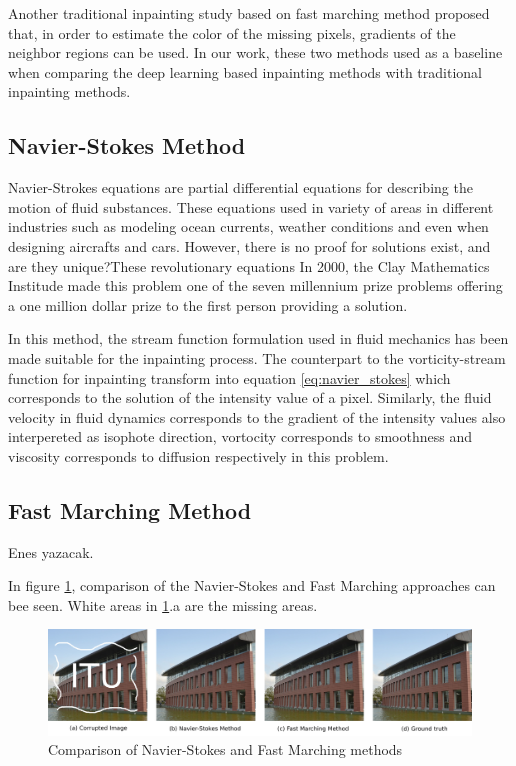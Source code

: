 Another traditional inpainting study based on fast marching method \cite{telea} proposed that, in order to estimate the color of the missing pixels, gradients of the neighbor regions can be used. In our work, these two methods used as a baseline when comparing the deep learning based inpainting methods with traditional inpainting methods.

\subsection{Navier-Stokes Method}

Navier-Strokes equations are partial differential equations for describing the motion of fluid substances. These equations used in variety of areas in different industries such as modeling ocean currents, weather conditions and even when designing aircrafts and cars. However, there is no proof for solutions exist, and are they unique?These revolutionary equations In 2000, the Clay Mathematics Institude made this problem one of the seven millennium prize problems \cite{clay} offering a one million dollar prize to the first person providing a solution.

In this method, the stream function formulation used in fluid mechanics has been made suitable for the inpainting process. The counterpart to the vorticity-stream function for inpainting transform into equation \ref{eq:navier_stokes} which corresponds to the solution of the intensity value of a pixel. Similarly, the fluid velocity in fluid dynamics corresponds to the gradient of the intensity values also interpereted as isophote direction, vortocity corresponds to smoothness and viscosity corresponds to diffusion respectively in this problem.

\subsection{Fast Marching Method}

Enes yazacak.

In figure \ref{fig:traditional_comparison}, comparison of the Navier-Stokes and Fast Marching approaches can bee seen. White areas in \ref{fig:traditional_comparison}.a are the missing areas.

\begin{figure}[h]
    \centering
    \includegraphics[width=14cm]{figures/traditional_comparison.png}
    \caption{Comparison of Navier-Stokes and Fast Marching methods}
    \label{fig:traditional_comparison}
\end{figure}
